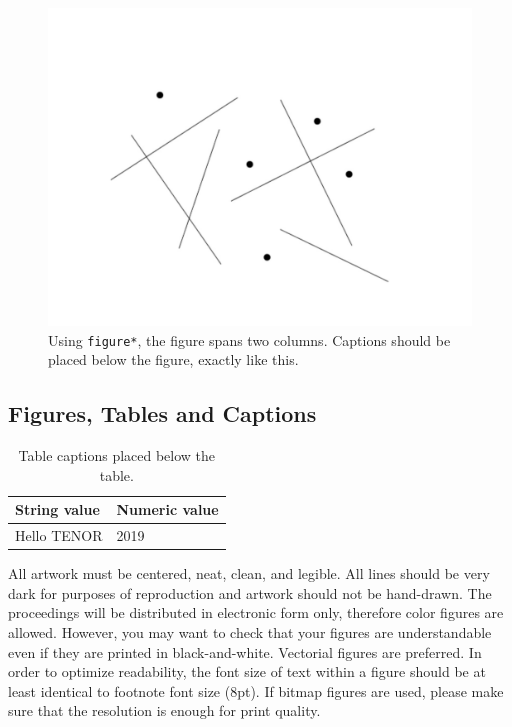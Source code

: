 \documentclass{article}
\begin{document}
\begin{figure}[ht!]
\centering
\includegraphics[width=1.5\columnwidth]{figure}
\caption{Using \texttt{figure*}, the figure spans two columns. Captions should be placed below the figure, exactly like this.
\label{fig:example}}
\end{figure}


\subsection{Figures, Tables and Captions}

\begin{table}[ht!]  %
\centering 
\begin{tabular}{|l|l|}
  \hline
  String value & Numeric value \\
  \hline
  Hello TENOR  & 2019 \\
  \hline
 \end{tabular}
 \caption{Table captions placed below the table.}
 \label{tab:example}
\end{table}

All artwork must be centered, neat, clean, and legible. 
All lines should be very dark for purposes of reproduction and artwork should not be hand-drawn. The proceedings will be distributed in electronic form only, therefore color figures are allowed.
However, you may want to check that your figures are understandable even if they are printed in black-and-white. 
Vectorial figures are preferred. 
In order to optimize readability, the font size of text within a figure should be at least identical to footnote font size (8pt). 
If bitmap figures are used, please make sure that the resolution is enough for print quality. 
\end{document}
